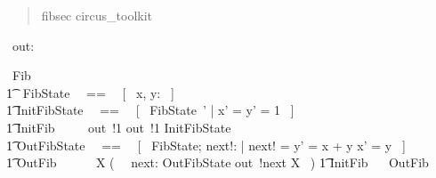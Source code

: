 \documentclass{article}
\newenvironment{zsection}{\begin{quotation}}{\end{quotation}}
\begin{document}
\begin{zsection}
   \SECTION fibsec \parents circus\_toolkit
\end{zsection}

\begin{circus}
    \circchannel\ out: \nat
\end{circus}

\begin{circus}
    \circprocess\ Fib ~~\circdef~~ \circbegin \\
    	\t1 \circstate\ FibState ~~==~~ [~ x, y: \nat ~] \\
    	\t1 InitFibState ~~==~~ [~ FibState~' | x' = y' = 1 ~] \\
	\t1 InitFib ~~\circdef~~ out~!1 \then out~!1 \then InitFibState \\
	\t1 OutFibState ~~==~~ [~ \Delta FibState; next!: \nat | next! = y' = x + y \land x' = y ~] \\
	\t1 OutFib ~~\circdef~~ \circmu\ X \circspot (~ \circvar\ next: \nat \circspot OutFibState \circseq out~!next \then X ~)
	\t1 \circspot InitFib ~\circseq~ OutFib \\
    \circend
\end{circus}
\end{document}

